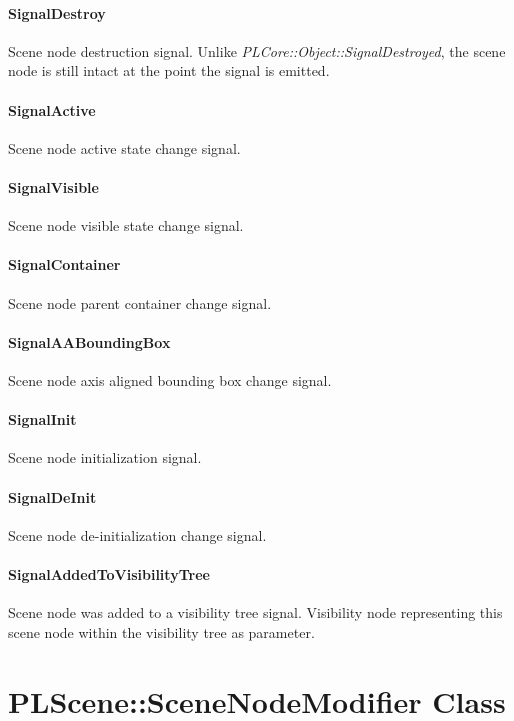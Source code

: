 \paragraph{SignalDestroy}
Scene node destruction signal. Unlike \emph{PLCore::Object::SignalDestroyed}, the scene node is still intact at the point the signal is emitted.

\paragraph{SignalActive}
Scene node active state change signal.

\paragraph{SignalVisible}
Scene node visible state change signal.

\paragraph{SignalContainer}
Scene node parent container change signal.

\paragraph{SignalAABoundingBox}
Scene node axis aligned bounding box change signal.

\paragraph{SignalInit}
Scene node initialization signal.

\paragraph{SignalDeInit}
Scene node de-initialization change signal.

\paragraph{SignalAddedToVisibilityTree}
Scene node was added to a visibility tree signal. Visibility node representing this scene node within the visibility tree as parameter.




\section{PLScene::SceneNodeModifier Class}


